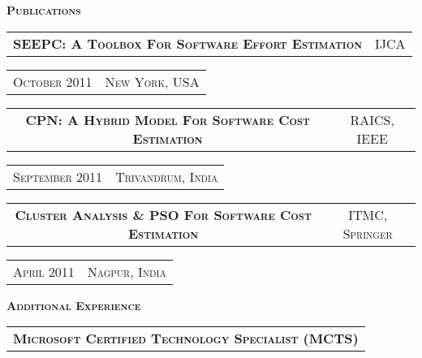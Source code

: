 \documentclass[10pt,letterpaper,oneside]{article}
\begin{document}
    \vspace{-5pt}
    \textcolor{light-gray}{\textbf{\large P\textsc{ublications}\\[0.1cm]}}
    \begin{tabular}{c|c}
        \textbf{\normalsize SEEPC: A T\textsc{oolbox}
        F\textsc{or} S\textsc{oftware} E\textsc{ffort}
    E\textsc{stimation}}
        &\textmd{\normalsize IJCA}
    \end{tabular}
    \hspace{1.85in}
    \textcolor{light-gray}{
        \begin{tabular}{c|c}
            {\small O\textsc{ctober 2011}}
            &{\small N\textsc{ew} Y\textsc{ork}, USA}\\[0.1cm]
        \end{tabular}
    }  
    \begin{tabular}{c|c}
        \textbf{\normalsize CPN: A H\textsc{ybrid} M\textsc{odel} F\textsc{or} S\textsc{oftware} C\textsc{ost} E\textsc{stimation}}
        &\textmd{\normalsize RAICS, IEEE}
    \end{tabular}
    \hspace{1.07in}
    \textcolor{light-gray}{
        \begin{tabular}{c|c}
            {\small S\textsc{eptember 2011}}
            &{\small T\textsc{rivandrum}, I\textsc{ndia}}\\[0.1cm]
        \end{tabular}
    }
    \vspace{4pt}
    \begin{tabular}{c|c}
        \textbf{\normalsize C\textsc{luster} A\textsc{nalysis} \& PSO F\textsc{or} S\textsc{oftware} C\textsc{ost} E\textsc{stimation}}
        &\textmd{\normalsize ITMC, S\textsc{pringer}}
    \end{tabular}
    \hspace{1.19in}
    \textcolor{light-gray}{
        \begin{tabular}{c|c}
            {\small A\textsc{pril 2011}}
            &{\small N\textsc{agpur}, I\textsc{ndia}}\\[0.1cm]
        \end{tabular}
    }
    \textcolor{light-gray}{\textbf{\large A\textsc{dditional} E\textsc{xperience}\\[0.1cm]}}
    \vspace{4pt}
    \begin{tabular}{l}
        \hspace{-0.15cm}    \textbf{\normalsize M\textsc{icrosoft} C\textsc{ertified} T\textsc{echnology} \textbf{S\textsc{pecialist} (MCTS)}}
    \end{tabular}
\end{document}
